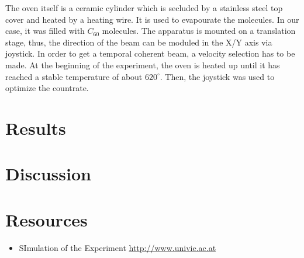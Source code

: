 \documentclass[12pt,a4paper]{article}
\begin{document}
\begin{multicols}{2}
The oven itself is a ceramic cylinder which is secluded by a stainless steel top cover and heated by a heating wire. It is used to evapourate the molecules. In our case, it was filled with $C_{60}$ molecules. The apparatus is mounted on a translation stage, thus, the direction of the beam can be moduled in the X/Y axis via joystick.
In order to get a temporal coherent beam, a velocity selection has to be made. 
At the beginning of the experiment, the oven is heated up until it has reached a stable temperature of about $620^\circ$. Then, the joystick was used to optimize the countrate.


\section{Results}





\section{Discussion}


\section{Resources}
\begin{itemize}
	\item SImulation of the Experiment \url{http://www.univie.ac.at}
\end{itemize}
%
%

\end{multicols}
\end{document}
